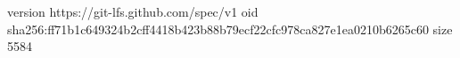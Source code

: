 version https://git-lfs.github.com/spec/v1
oid sha256:ff71b1c649324b2cff4418b423b88b79ecf22cfc978ca827e1ea0210b6265c60
size 5584
